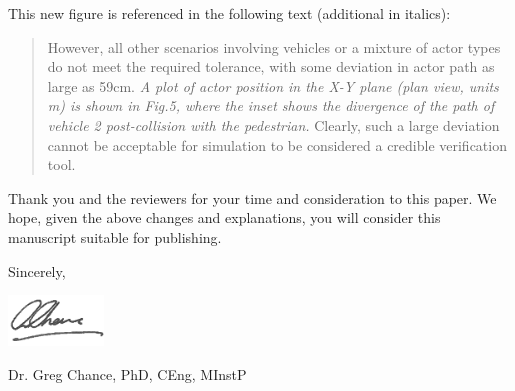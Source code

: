 \documentclass[11pt, a4paper]{letter} %
\begin{document}
\begin{letter}
This new figure is referenced in the following text (additional in italics):
\begin{quote}
However, all other scenarios involving vehicles or a mixture of actor types do not meet the required tolerance, with some deviation in actor path as large as 59cm. \textit{A plot of actor position in the X-Y plane (plan view, units m) is shown in Fig.5, where the inset shows the divergence of the path of vehicle 2 post-collision with the pedestrian.} Clearly, such a large deviation cannot be acceptable for simulation to be considered a credible verification tool.
\end{quote}

\bigskip

Thank you and the reviewers for your time and consideration to this paper. We hope, given the above changes and explanations, you will consider this manuscript suitable for publishing. 

\bigskip

Sincerely,

\bigskip

\includegraphics[width=1in]{signature.png}

Dr. Greg Chance, PhD, CEng, MInstP

\end{letter}
\end{document}
